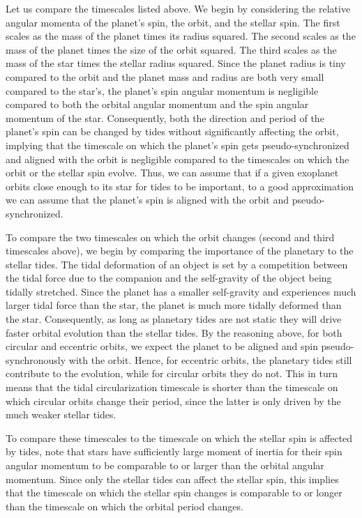 Let us compare the timescales listed above. We begin by considering the relative
angular momenta of the planet's spin, the orbit, and the stellar spin. The first
scales as the mass of the planet times its radius squared. The second scales as
the mass of the planet times the size of the orbit squared. The third scales as
the mass of the star times the stellar radius squared. Since the planet radius
is tiny compared to the orbit and the planet mass and radius are both very small
compared to the star's, the planet's spin angular momentum is negligible
compared to both the orbital angular momentum and the spin angular momentum of
the star. Consequently, both the direction and period of the planet's spin can
be changed by tides without significantly affecting the orbit, implying that the
timescale on which the planet's spin gets pseudo-synchronized and aligned with
the orbit is negligible compared to the timescales on which the orbit or the
stellar spin evolve. Thus, we can assume that if a given exoplanet orbits close
enough to its star for tides to be important, to a good approximation we can
assume that the planet's spin is aligned with the orbit and pseudo-synchronized.

To compare the two timescales on which the orbit changes (second and third
timescales above), we begin by comparing the importance of the planetary to the
stellar tides. The tidal deformation of an object is set by a competition
between the tidal force due to the companion and the self-gravity of the object
being tidally stretched. Since the planet has a smaller self-gravity and
experiences much larger tidal force than the star, the planet is much more
tidally deformed than the star. Consequently, as long as planetary tides are not
static they will drive faster orbital evolution than the stellar tides. By the
reasoning above, for both circular and eccentric orbits, we expect the planet to
be aligned and spin pseudo-synchronously with the orbit.  Hence, for eccentric
orbits, the planetary tides still contribute to the evolution, while for
circular orbits they do not. This in turn means that the tidal circularization
timescale is shorter than the timescale on which circular orbits change their
period, since the latter is only driven by the much weaker stellar tides.

To compare these timescales to the timescale on which the stellar spin is
affected by tides, note that stars have sufficiently large moment of inertia
for their spin angular momentum to be comparable to or larger than the orbital
angular momentum. Since only the stellar tides can affect the stellar spin, this
implies that the timescale on which the stellar spin changes is comparable to or
longer than the timescale on which the orbital period changes.
